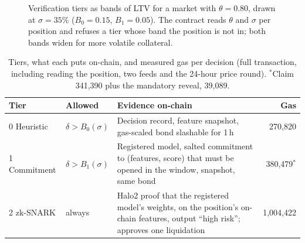 \documentclass[sigconf,nonacm]{acmart}
\begin{document}
\begin{figure}[t]
  \centering
  \caption{Verification tiers as bands of LTV for a market with $\theta=0.80$, drawn at $\sigma=35\%$ ($B_0=0.15$, $B_1=0.05$). The contract reads $\theta$ and $\sigma$ per position and refuses a tier whose band the position is not in; both bands widen for more volatile collateral.}
  \label{fig:bands}
\end{figure}

\begin{table}[t]
  \caption{Tiers, what each puts on-chain, and measured gas per decision (full transaction, including reading the position, two feeds and the 24-hour price round). $^{*}$Claim 341,390 plus the mandatory reveal, 39,089.}
  \label{tab:tiers}
  \footnotesize
  \setlength{\tabcolsep}{3pt}
  \begin{tabularx}{\columnwidth}{@{}lP{1.15cm}Lr@{}}
    \toprule
    \textbf{Tier} & \textbf{Allowed} & \textbf{Evidence on-chain} & \textbf{Gas} \\
     Heuristic & $\delta>B_0(\sigma)$ & Decision record, feature snapshot, gas-scaled bond slashable for 1\,h & 270,820 \\
    1 Commitment & $\delta>B_1(\sigma)$ & Registered model, salted commitment to (features, score) that must be opened in the window, snapshot, same bond & 380,479$^{*}$ \\
    2 zk-SNARK & always & Halo2 proof that the registered model's weights, on the position's on-chain features, output ``high risk''; approves one liquidation & 1,004,422 \\
    \bottomrule
  \end{tabularx}
\end{table}
\end{document}
